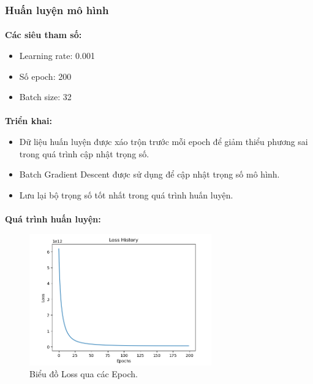\subsubsection{Huấn luyện mô hình}


\paragraph{}{\textbf{Các siêu tham số:}}
\begin{itemize}
    \item Learning rate: 0.001
    \item Số epoch: 200
    \item Batch size: 32
\end{itemize}

\paragraph{}{\textbf{Triển khai:}}
\begin{itemize}
    \item Dữ liệu huấn luyện được xáo trộn trước mỗi epoch để giảm thiểu phương sai trong quá trình cập nhật trọng số.
    \item Batch Gradient Descent được sử dụng để cập nhật trọng số mô hình.
    \item Lưu lại bộ trọng số tốt nhất trong quá trình huấn luyện.
\end{itemize}

\paragraph{}{\textbf{Quá trình huấn luyện:}}

\begin{figure}[H]
    \centering
    \includegraphics[width=0.7\textwidth]{img/lossPCA.png} %
    \caption{Biểu đồ Loss qua các Epoch.}
    \label{fig:loss_plot}
\end{figure}

